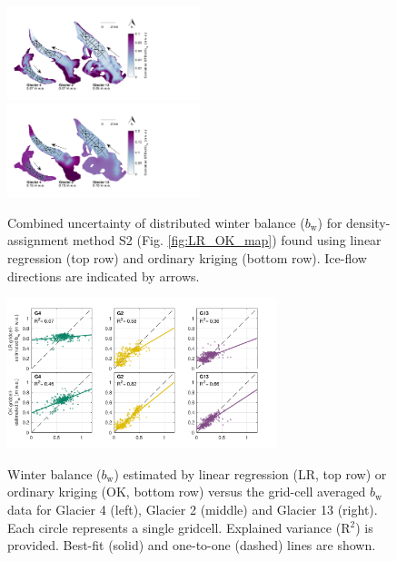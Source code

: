 \documentclass[review,oneside, letterpaper]{igs}
\begin{document}
\begin{figure}
	\centering
	\includegraphics[width =0.5\textwidth]{LRstd_map_ALL.pdf}\\
	\includegraphics[width =0.5\textwidth]{OKstd_map_ALL.pdf}\\
	\caption{Combined uncertainty of distributed winter balance ($b_\mathrm{w}$) for density-assignment method S2 (Fig. \ref{fig:LR_OK_map}) found using linear regression (top row) and ordinary kriging (bottom row). Ice-flow directions are indicated by arrows.}
	\label{fig:WSMBspatialvar}
\end{figure}

\begin{figure}
	\centering
	\includegraphics[width =0.7\textwidth]{observedVSestimated_S2.pdf}\\
	\caption{Winter balance ($b_\mathrm{w}$) estimated by linear regression (LR, top row) or ordinary kriging (OK, bottom row) versus the grid-cell averaged $b_\mathrm{w}$ data for Glacier 4 (left), Glacier 2 (middle) and Glacier 13 (right). Each circle represents a single gridcell. Explained variance (R$^2$) is provided. Best-fit (solid) and one-to-one (dashed) lines are shown.}
	\label{fig:observedVSestimated_S2}
\end{figure}
\end{document}
